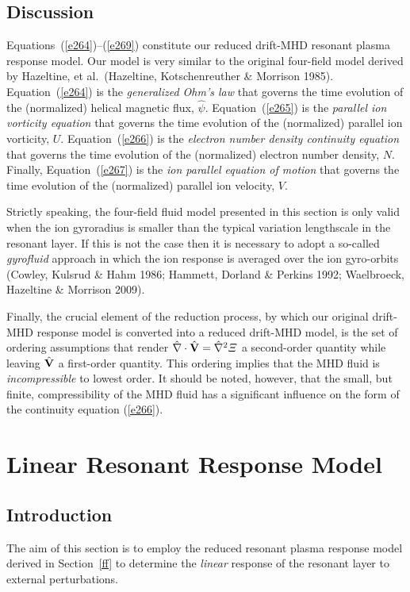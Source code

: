 \documentclass[notitlepage,12pt]{article}
\begin{document}
\subsection{Discussion}
Equations~(\ref{e264})--(\ref{e269}) constitute our reduced drift-MHD resonant plasma response model. Our model is very similar
to the original four-field model derived by Hazeltine, et al.\ (Hazeltine, Kotschenreuther \& Morrison 1985). Equation~(\ref{e264}) is the {\em generalized
Ohm's law}\/ that governs the time evolution of the (normalized) helical magnetic flux, $\hat{\psi}$. Equation~(\ref{e265}) is the {\em parallel
ion vorticity equation}\/ that governs the  time evolution of the (normalized) parallel ion vorticity, $U$. 
Equation~(\ref{e266}) is the {\em electron number density continuity equation}\/ that 
governs the time evolution of the (normalized) electron number density, $N$. Finally, Equation~(\ref{e267}) is the
{\em ion parallel equation of motion}\/ that governs the time evolution of the  (normalized) parallel ion velocity, $V$. 

Strictly speaking, the four-field fluid model 
presented in this section is only valid when the ion gyroradius is smaller than the typical variation lengthscale in the resonant layer. 
If this is not the case then it is necessary to adopt a so-called {\em gyrofluid}\/ approach in which the ion response is
averaged over the ion gyro-orbits (Cowley, Kulsrud \& Hahm 1986; Hammett, Dorland \& Perkins 1992; Waelbroeck, Hazeltine \& Morrison 2009). 

Finally, the crucial element of the reduction process, by which our original drift-MHD response model is converted into a
reduced drift-MHD model, is the set of ordering assumptions that render $\hat{\nabla}\cdot \hat{\bf V}=\hat{\nabla}^2{\mit\Xi}$
a second-order quantity while leaving $\hat{\bf V}$ a first-order quantity. This ordering implies that the  MHD fluid is
{\em incompressible}\/ to lowest order. It should be noted, however, that the small, but finite, compressibility of the
MHD fluid has a significant influence on the form of the continuity equation (\ref{e266}).

\section{Linear Resonant  Response Model}\label{linear}
\subsection{Introduction}
The aim of this section is to employ the reduced resonant plasma response model derived in Section~\ref{ff} to determine the {\em linear}\/ response of the resonant layer to external perturbations.
\end{document}

